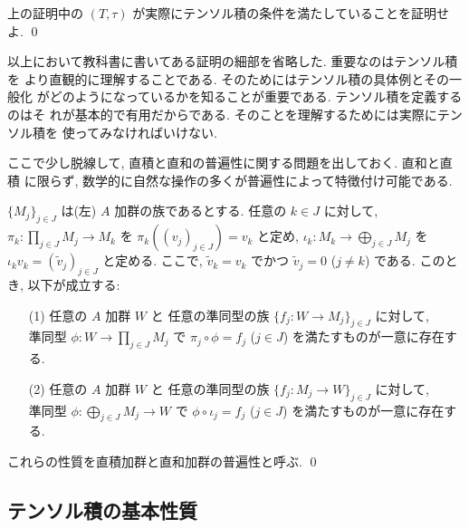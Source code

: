 \documentclass[12pt,twoside]{jarticle}
\begin{document}
\begin{question}
  上の証明中の $(T,\tau)$ が実際にテンソル積の条件を満たしていることを証明せ
  よ. \qed
\end{question}

以上において教科書に書いてある証明の細部を省略した.  重要なのはテンソル積を
より直観的に理解することである.  そのためにはテンソル積の具体例とその一般化
がどのようになっているかを知ることが重要である.  テンソル積を定義するのはそ
れが基本的で有用だからである.  そのことを理解するためには実際にテンソル積を
使ってみなければいけない.

ここで少し脱線して, 直積と直和の普遍性に関する問題を出しておく.  直和と直積
に限らず, 数学的に自然な操作の多くが普遍性によって特徴付け可能である.

\begin{question}[直積と直和の普遍性]
  $\{M_j\}_{j\in J}$ は(左) $A$ 加群の族であるとする. 
  任意の $k\in J$ に対して,
  $\pi_k:\prod_{j\in J}M_j\to M_k$ を %
  $\pi_k((v_j)_{j\in J}) = v_k$ と定め,
  $\iota_k:M_k\to\bigoplus_{j\in J}M_j$ を %
  $\iota_k v_k = (\tilde v_j)_{j\in J}$ と定める.
  ここで, $\tilde v_k = v_k$ でかつ $\tilde v_j = 0$ ($j\ne k$) である.
  このとき, 以下が成立する:
  \begin{itemize}
  \item[(1)] 任意の $A$ 加群 $W$ と
    任意の準同型の族 $\{f_j:W\to M_j\}_{j\in J}$ に対して, \\
    準同型 $\phi:W\to\prod_{j\in J}M_j$ 
    で $\pi_j\circ\phi=f_j$ ($j\in J$) を満たすものが一意に存在する.
  \item[(2)] 任意の $A$ 加群 $W$ と
    任意の準同型の族 $\{f_j:M_j\to W\}_{j\in J}$ に対して, \\
    準同型 $\phi:\bigoplus_{j\in J}M_j\to W$ 
    で $\phi\circ\iota_j=f_j$ ($j\in J$) を満たすものが一意に存在する.
  \end{itemize}
  これらの性質を直積加群と直和加群の普遍性と呼ぶ. \qed
\end{question}


\subsection{テンソル積の基本性質}
\end{document}
